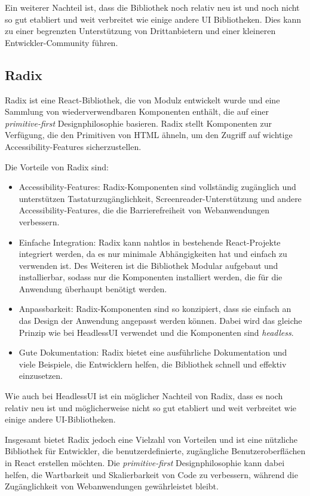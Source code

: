 Ein weiterer Nachteil ist, dass die Bibliothek noch relativ neu ist und noch nicht so gut etabliert und weit verbreitet wie einige andere UI Bibliotheken. Dies kann zu einer begrenzten Unterstützung von Drittanbietern und einer kleineren Entwickler-Community führen.

\subsection{Radix}
\label{secsec:radix}

Radix ist eine React-Bibliothek, die von Modulz entwickelt wurde und eine Sammlung von wiederverwendbaren Komponenten enthält, die auf einer \emph{primitive-first} Designphilosophie basieren. Radix stellt Komponenten zur Verfügung, die den Primitiven von HTML ähneln, um den Zugriff auf wichtige Accessibility-Features sicherzustellen.

Die Vorteile von Radix sind:

\begin{itemize}
    \item Accessibility-Features: Radix-Komponenten sind vollständig zugänglich und unterstützen Tastaturzugänglichkeit, Screenreader-Unterstützung und andere Accessibility-Features, die die Barrierefreiheit von Webanwendungen verbessern.
    \item Einfache Integration: Radix kann nahtlos in bestehende React-Projekte integriert werden, da es nur minimale Abhängigkeiten hat und einfach zu verwenden ist. Des Weiteren ist die Bibliothek Modular aufgebaut und installierbar, sodass nur die Komponenten installiert werden, die für die Anwendung überhaupt benötigt werden.
    \item Anpassbarkeit: Radix-Komponenten sind so konzipiert, dass sie einfach an das Design der Anwendung angepasst werden können. Dabei wird das gleiche Prinzip wie bei HeadlessUI verwendet und die Komponenten sind \emph{headless}.
    \item Gute Dokumentation: Radix bietet eine ausführliche Dokumentation und viele Beispiele, die Entwicklern helfen, die Bibliothek schnell und effektiv einzusetzen.
\end{itemize}

Wie auch bei HeadlessUI ist ein möglicher Nachteil von Radix, dass es noch relativ neu ist und möglicherweise nicht so gut etabliert und weit verbreitet wie einige andere UI-Bibliotheken.

Insgesamt bietet Radix jedoch eine Vielzahl von Vorteilen und ist eine nützliche Bibliothek für Entwickler, die benutzerdefinierte, zugängliche Benutzeroberflächen in React erstellen möchten. Die \emph{primitive-first} Designphilosophie kann dabei helfen, die Wartbarkeit und Skalierbarkeit von Code zu verbessern, während die Zugänglichkeit von Webanwendungen gewährleistet bleibt.